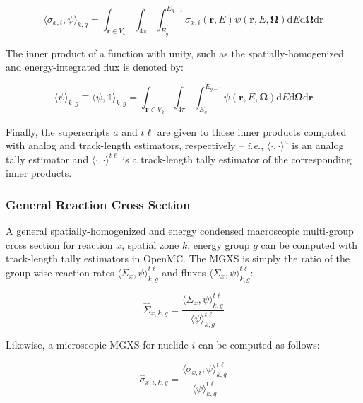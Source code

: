 \begin{equation}
\label{eqn:chap3-angle-rxn-rate}
\langle \sigma_{x,i}, \psi \rangle_{k,g} = \int_{\mathbf{r} \in V_{k}} \int_{4\pi} \int_{E_{g}}^{E_{g-1}} \sigma_{x,i}(\mathbf{r},E)\psi(\mathbf{r},E,\mathbf{\Omega}) \mathrm{d}E\mathrm{d}\mathbf{\Omega}\mathrm{d}\mathbf{r}
\end{equation}

\noindent The inner product of a function with unity, such as the spatially-homogenized and energy-integrated flux is denoted by:

\begin{equation}
\label{eqn:chap3-angle-flux}
\langle \psi \rangle_{k,g} \equiv \langle \psi, \mathbb{1} \rangle_{k,g} = \int_{\mathbf{r} \in V_{k}} \int_{4\pi} \int_{E_{g}}^{E_{g-1}} \psi(\mathbf{r},E,\mathbf{\Omega}) \mathrm{d}E\mathrm{d}\mathbf{\Omega}\mathrm{d}\mathbf{r}
\end{equation}

Finally, the superscripts $a$ and $t\ell$ are given to those inner products computed with analog and track-length estimators, respectively -- \textit{i.e.}, $\langle \cdot,\cdot \rangle^{a}$ is an analog tally estimator and $\langle \cdot,\cdot \rangle^{t\ell}$ is a track-length tally estimator of the corresponding inner products.


\subsubsection{General Reaction Cross Section}
\label{subsubsec:chap3-gen-xs}

A general spatially-homogenized and energy condensed macroscopic multi-group cross section for reaction $x$, spatial zone $k$, energy group $g$ can be computed with track-length tally estimators in OpenMC. The \ac{MGXS} is simply the ratio of the group-wise reaction rates $\langle \Sigma_{x}, \psi \rangle_{k,g}^{t\ell}$ and fluxes $\langle \Sigma_{x}, \psi \rangle_{k,g}^{t\ell}$:

\begin{equation}
\label{eqn:chap3-general-macro}
\hat{\Sigma}_{x,k,g} = \frac{\langle \Sigma_{x}, \psi \rangle_{k,g}^{t\ell}}{\langle \psi \rangle_{k,g}^{t\ell}}
\end{equation}

\noindent Likewise, a microscopic \ac{MGXS} for nuclide $i$ can be computed as follows:

\begin{equation}
\label{eqn:chap3-general-micro}
\hat{\sigma}_{x,i,k,g} = \frac{\langle \sigma_{x,i}, \psi \rangle_{k,g}^{t\ell}}{\langle \psi \rangle_{k,g}^{t\ell}}
\end{equation}

